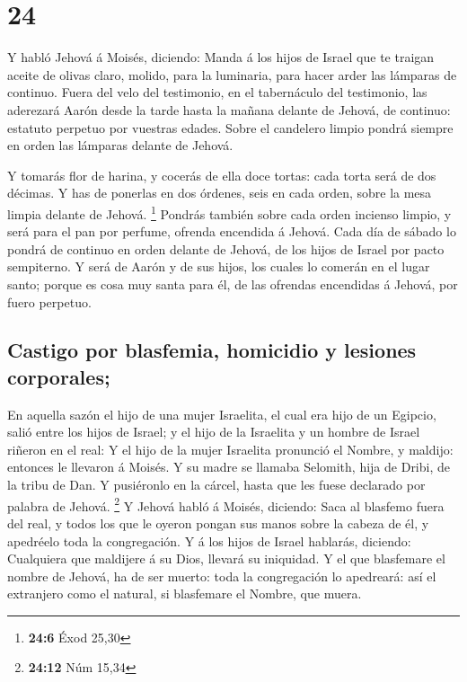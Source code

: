 \hypertarget{section-23}{%
\section{24}\label{section-23}}

 Y habló Jehová á Moisés, diciendo:  Manda á
los hijos de Israel que te traigan aceite de olivas claro, molido, para
la luminaria, para hacer arder las lámparas de continuo. 
Fuera del velo del testimonio, en el tabernáculo del testimonio, las
aderezará Aarón desde la tarde hasta la mañana delante de Jehová, de
continuo: estatuto perpetuo por vuestras edades.  Sobre el
candelero limpio pondrá siempre en orden las lámparas delante de Jehová.

 Y tomarás flor de harina, y cocerás de ella doce tortas:
cada torta será de dos décimas.  Y has de ponerlas en dos
órdenes, seis en cada orden, sobre la mesa limpia delante de Jehová.
\footnote{\textbf{24:6} Éxod 25,30}  Pondrás también sobre
cada orden incienso limpio, y será para el pan por perfume, ofrenda
encendida á Jehová.  Cada día de sábado lo pondrá de
continuo en orden delante de Jehová, de los hijos de Israel por pacto
sempiterno.  Y será de Aarón y de sus hijos, los cuales lo
comerán en el lugar santo; porque es cosa muy santa para él, de las
ofrendas encendidas á Jehová, por fuero perpetuo.

\hypertarget{castigo-por-blasfemia-homicidio-y-lesiones-corporales}{%
\subsection{Castigo por blasfemia, homicidio y lesiones
corporales;}\label{castigo-por-blasfemia-homicidio-y-lesiones-corporales}}

 En aquella sazón el hijo de una mujer Israelita, el cual
era hijo de un Egipcio, salió entre los hijos de Israel; y el hijo de la
Israelita y un hombre de Israel riñeron en el real:  Y el
hijo de la mujer Israelita pronunció el Nombre, y maldijo: entonces le
llevaron á Moisés. Y su madre se llamaba Selomith, hija de Dribi, de la
tribu de Dan.  Y pusiéronlo en la cárcel, hasta que les
fuese declarado por palabra de Jehová. \footnote{\textbf{24:12} Núm
  15,34}  Y Jehová habló á Moisés, diciendo:
 Saca al blasfemo fuera del real, y todos los que le
oyeron pongan sus manos sobre la cabeza de él, y apedréelo toda la
congregación.  Y á los hijos de Israel hablarás,
diciendo: Cualquiera que maldijere á su Dios, llevará su iniquidad.
 Y el que blasfemare el nombre de Jehová, ha de ser
muerto: toda la congregación lo apedreará: así el extranjero como el
natural, si blasfemare el Nombre, que muera.

